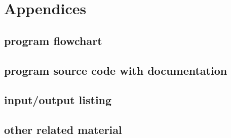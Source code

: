 \section{Appendices}


\subsection{program flowchart}


\subsection{program source code with documentation}

\subsection{input/output listing}

\subsection{other related material}